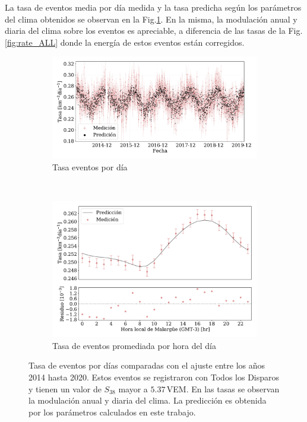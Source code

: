 La tasa de eventos media por día  medida y la tasa predicha según los parámetros del clima obtenidos se observan en la Fig.\ref{fig:rate_dayly_AllTriggers}. En la misma, la modulación anual y diaria del clima sobre los eventos es apreciable, a diferencia de las tasas de la Fig.\,\ref{fig:rate_ALL} donde  la energía de estos eventos están corregidos.  
\begin{figure}[H]
\centering
  \begin{subfigure}[b]{0.8\textwidth}
  \includegraphics[width=\textwidth]{Graphs/rate_dayly/AllTriggers_S38_over_1EeV_rate_v3.pdf}
  \caption{Tasa eventos por día}\label{fig:rate_dayly_AllTriggers}
  \end{subfigure}\\
  \begin{subfigure}[b]{0.8\textwidth}
  \includegraphics[width=\textwidth]{Graphs/rate_hour_of_the_day/AllTriggers_S38_over_1EeV_hour_of_the_day.pdf}
  \caption{Tasa de eventos promediada por hora del día }\label{fig:rate_hod_AllTriggers}
  \end{subfigure}
  \caption{Tasa de eventos por días comparadas con el ajuste entre los años 2014 hasta 2020. Estos eventos se registraron con Todos los Disparos  y tienen un valor de $S_{38}$ mayor a $5.37\,$VEM. En las tasas se observan la modulación anual y diaria del clima. La predicción es obtenida por los parámetros calculados en este trabajo.}\label{fig:rate__AllTriggers}
\end{figure}

